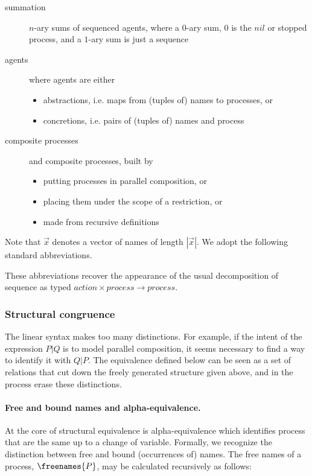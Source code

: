 \begin{description}
\item [summation] $n$-ary sums of sequenced agents, where a $0$-ary
  sum, $0$ is the $nil$ or stopped process, and a $1$-ary sum is just a
  sequence
\item [agents] where agents are either
  \begin{itemize}
  \item abstractions, i.e. maps from (tuples of) names
    to processes, or
  \item concretions, i.e. pairs of (tuples of) names and process
  \end{itemize}
\item [composite processes] and composite processes, built by
  \begin{itemize}
    \item putting processes in parallel composition, or
    \item placing them under the scope of a restriction, or
    \item made from recursive definitions 
  \end{itemize}
\end{description}

Note that $\vec{x}$ denotes a vector of names of length
$|\vec{x}|$. We adopt the following standard abbreviations.


These abbreviations recover the appearance of the usual decomposition
of sequence as typed $action \times process \to process$.

\subsubsection{Structural congruence}

The linear syntax makes too many distinctions. For example, if the
intent of the expression $P|Q$ is to model parallel composition, it
seems necessary to find a way to identify it with $Q|P$. The
equivalence defined below can be seen as a set of relations that cut
down the freely generated structure given above, and in the process
erase these distinctions.

\paragraph{Free and bound names and alpha-equivalence.} At the core of
structural equivalence is alpha-equivalence which identifies process
that are the same up to a change of variable. Formally, we recognize
the distinction between free and bound (occurrences of) names. The
free names of a process, $\freenames{P}$, may be calculated
recursively as follows:

